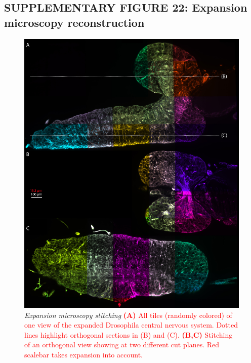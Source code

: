 \documentclass[]{spie}  %
\def\red{\textcolor{red}}
\begin{document}
\subsection*{SUPPLEMENTARY FIGURE 22: Expansion microscopy reconstruction}
\begin{figure}[h!]
\center\includegraphics[width=\textwidth-1.35cm]{fig-expansion_tiling.jpg}
\vspace{2.0mm}
\caption{\hspace{-0.5mm} \emph{Expansion microscopy stitching} \red{\textbf{(A)} All tiles (randomly colored) of one view of the expanded Drosophila central nervous system. Dotted lines highlight orthogonal sections in (B) and (C). \textbf{(B,C)} Stitching of an orthogonal view showing at two different cut planes. Red scalebar takes expansion into account.}
}
\label{fig:sup-fig-expansion-microscopy}
\end{figure}

\pagebreak
\end{document}
